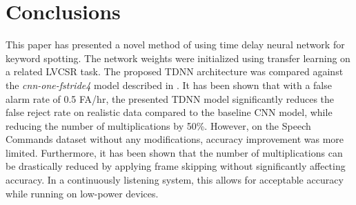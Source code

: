 \documentclass{article}
\begin{document}
\section{Conclusions}
\label{sec:conclusions}
This paper has presented a novel method of using time delay neural network for keyword spotting. 
The network weights were initialized using transfer learning on a related LVCSR task. The proposed TDNN architecture was compared against the \textit{cnn-one-fstride4} model described in \cite{Sainath15}. It has been shown that with a false alarm rate of 0.5 FA/hr, the presented TDNN model significantly reduces the false reject rate on realistic data compared to the baseline CNN model, while reducing the number of multiplications by 50\%.  However, on the Speech Commands dataset without any modifications, accuracy improvement was more limited.  Furthermore, it has been shown that the number of multiplications can be drastically reduced by applying frame skipping without significantly affecting accuracy.  In a continuously listening system, this allows for acceptable accuracy while running on low-power devices.





\end{document}
